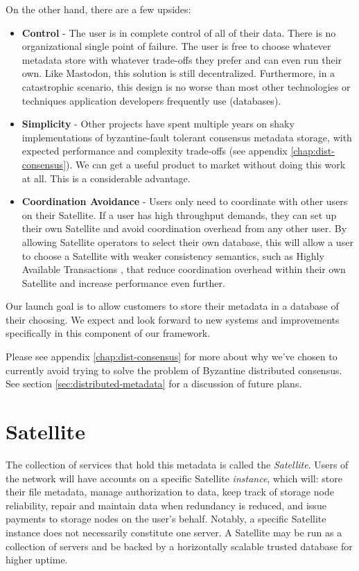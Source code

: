 \documentclass[8pt,fleqn,openany]{book}
\begin{document}
On the other hand, there are a few upsides:
\begin{itemize}
\item {\bf Control} - The user is in complete control of all of their data.
  There is no organizational single point of failure. The user is free
  to choose whatever metadata store with whatever trade-offs they prefer and
  can even run their own. Like
  Mastodon\cite{mastodon}, this solution is still decentralized. Furthermore, in a
  catastrophic scenario, this design is no worse than most other technologies or
  techniques application developers frequently use (databases).
\item {\bf Simplicity} - Other projects have spent multiple years on shaky
  implementations of byzantine-fault tolerant consensus metadata storage,
  with expected performance and complexity trade-offs
  (see appendix \ref{chap:dist-consensus}).
  We can get a useful product to market without doing this work at all.
  This is a considerable advantage.
\item {\bf Coordination Avoidance} - Users only need to coordinate with
  other users on their Satellite. If a user has high throughput demands,
  they can set up their own Satellite and avoid coordination overhead from
  any other user. By allowing Satellite operators to select their own database,
  this will allow a user to choose a Satellite with weaker consistency
  semantics, such as Highly Available Transactions \cite{hat}, that reduce
  coordination overhead within their own Satellite and increase performance
  even further.
\end{itemize}

Our launch goal is to allow customers to store their metadata in a database of
their choosing. We expect and look forward to new systems and improvements
specifically in this component of our framework.

Please see appendix \ref{chap:dist-consensus} for more about why we've chosen
to currently avoid trying to solve the problem of Byzantine distributed consensus.
See section \ref{sec:distributed-metadata} for a discussion of future plans.

\section{Satellite}

The collection of services that hold this metadata is called the
{\em Satellite}. Users of the network will have accounts on a specific
Satellite {\em instance}, which will: store their file metadata, manage authorization
to data, keep track of storage node reliability, repair and maintain data when
redundancy is reduced, and issue payments to storage nodes on the user's behalf.
Notably, a specific Satellite instance does not necessarily constitute one
server. A Satellite may be run as a collection of servers and be backed by
a horizontally scalable trusted database for higher uptime.
\end{document}
